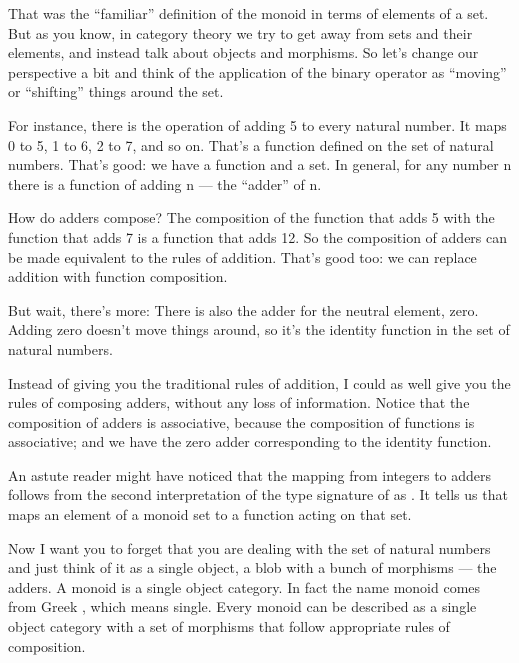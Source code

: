 That was the ``familiar'' definition of the monoid in terms of elements
of a set. But as you know, in category theory we try to get away from
sets and their elements, and instead talk about objects and morphisms.
So let's change our perspective a bit and think of the application of
the binary operator as ``moving'' or ``shifting'' things around the set.

For instance, there is the operation of adding 5 to every natural
number. It maps 0 to 5, 1 to 6, 2 to 7, and so on. That's a function
defined on the set of natural numbers. That's good: we have a function
and a set. In general, for any number n there is a function of adding n
--- the ``adder'' of n.

How do adders compose? The composition of the function that adds 5 with
the function that adds 7 is a function that adds 12. So the composition
of adders can be made equivalent to the rules of addition. That's good
too: we can replace addition with function composition.

But wait, there's more: There is also the adder for the neutral element,
zero. Adding zero doesn't move things around, so it's the identity
function in the set of natural numbers.

Instead of giving you the traditional rules of addition, I could as well
give you the rules of composing adders, without any loss of information.
Notice that the composition of adders is associative, because the
composition of functions is associative; and we have the zero adder
corresponding to the identity function.

An astute reader might have noticed that the mapping from integers to
adders follows from the second interpretation of the type signature of
 as . It
tells us that  maps an element of a monoid set to a
function acting on that set.

Now I want you to forget that you are dealing with the set of natural
numbers and just think of it as a single object, a blob with a bunch of
morphisms --- the adders. A monoid is a single object category. In fact
the name monoid comes from Greek , which means single. Every
monoid can be described as a single object category with a set of
morphisms that follow appropriate rules of composition.


\begin{figure}
  \centering
\end{figure}

